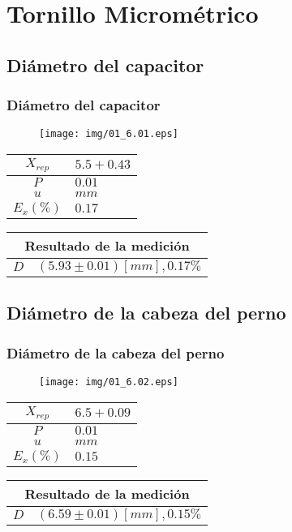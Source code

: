 \documentclass[letter,11pt]{beamer}
\begin{document}
\section{Tornillo Micrométrico}

\subsection{Diámetro del capacitor}
\begin{frame}
\frametitle{Diámetro del capacitor}
\vspace*{0.8cm}
\begin{figure}
\centering
\texttt{[image: img/01\_6.01.eps]}
\end{figure}
\vspace*{0.4cm}
\scriptsize
\begin{tabular}{|c|>{\centering}m{1.8cm}<{\centering}|}
\hline
$X_{rep}$ &  $5.5+0.43$ \tabularnewline \hline
      $P$ &      $0.01$ \tabularnewline \hline
      $u$ &        $mm$ \tabularnewline \hline
$E_x(\%)$ &      $0.17$ \tabularnewline \hline
\end{tabular}
\quad
\begin{tabular}{|c|>{\centering}m{5.7cm}<{\centering}|}
\hline
\multicolumn{2}{|c|}{\textbf{Resultado de la medición}} \\ \hline
$D$ & $( 5.93\pm0.01)[mm], 0.17\%$ \tabularnewline \hline
\end{tabular}
\end{frame}

\subsection{Diámetro de la cabeza del perno}
\begin{frame}
\frametitle{Diámetro de la cabeza del perno}
\vspace*{0.8cm}
\begin{figure}
\centering
\texttt{[image: img/01\_6.02.eps]}
\end{figure}
\vspace*{0.4cm}
\scriptsize
\begin{tabular}{|c|>{\centering}m{1.8cm}<{\centering}|}
\hline
$X_{rep}$ &  $6.5+0.09$ \tabularnewline \hline
      $P$ &      $0.01$ \tabularnewline \hline
      $u$ &        $mm$ \tabularnewline \hline
$E_x(\%)$ &      $0.15$ \tabularnewline \hline
\end{tabular}
\quad
\begin{tabular}{|c|>{\centering}m{5.7cm}<{\centering}|}
\hline
\multicolumn{2}{|c|}{\textbf{Resultado de la medición}} \\ \hline
$D$ & $( 6.59\pm0.01)[mm], 0.15\%$ \tabularnewline \hline
\end{tabular}
\end{frame}
\end{document}
